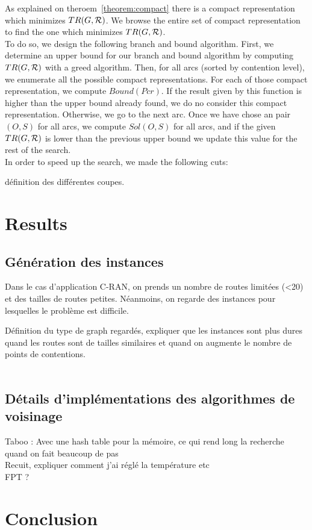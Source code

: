 \documentclass[english]{article}
\begin{document}
 As explained on theroem~\ref{theorem:compact} there is a compact representation which minimizes $TR(G,{\cal R})$. We browse the entire set of compact representation to find the one which minimizes $TR(G,{\cal R})$.\\
 To do so, we design the following branch and bound algorithm. First, we determine an upper bound for our branch and bound algorithm by computing $TR(G,{\cal R})$ with a greed algorithm. Then, for all arcs (sorted by contention level), we enumerate all the possible compact representations. For each of those compact representation, we compute $Bound(Pcr)$. If the result given by this function is higher than the upper bound already found, we do no consider this compact representation. Otherwise, we go to the next arc. Once we have chose an pair $(O,S)$ for all arcs, we compute $Sol(O,S)$ for all arcs, and if the given $TR(G,{\cal R})$ is lower than the previous upper bound we update this value for the rest of the search.\\


In order to speed up the search, we made the following cuts:

définition des différentes coupes.\\
\section{Results}




\subsection{Génération des instances}
Dans le cas d'application C-RAN, on prends un nombre de routes limitées (<20) et des tailles de routes petites. Néanmoins, on regarde des instances pour lesquelles le problème est difficile.\

Définition du type de graph regardés, expliquer que les instances sont plus dures quand les routes sont de tailles similaires et quand on augmente le nombre de points de contentions.\\
\
\subsection{Détails d'implémentations des algorithmes de voisinage}
Taboo : Avec une hash table pour la mémoire, ce qui rend long la recherche quand on fait beaucoup de pas\\
Recuit, expliquer comment j'ai réglé la température etc\\

FPT ?

\section{Conclusion}


\end{document}
